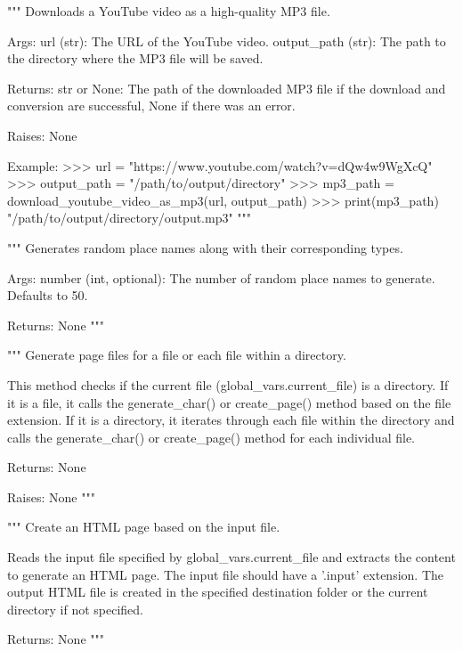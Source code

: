\begin{codebox}[Creator.download\_youtube\_video\_as\_mp3(self, url, output\_path="../music")]
"""
Downloads a YouTube video as a high-quality MP3 file.

Args:
    url (str): The URL of the YouTube video.
    output_path (str): The path to the directory where the MP3 file will be saved.

Returns:
    str or None: The path of the downloaded MP3 file if the download and conversion
                 are successful, None if there was an error.

Raises:
    None

Example:
    >>> url = "https://www.youtube.com/watch?v=dQw4w9WgXcQ"
    >>> output_path = "/path/to/output/directory"
    >>> mp3_path = download_youtube_video_as_mp3(url, output_path)
    >>> print(mp3_path)
    "/path/to/output/directory/output.mp3"
"""
\end{codebox}

\begin{codebox}[Creator.random\_place(self, number=100)]
"""
Generates random place names along with their corresponding types.

Args:
    number (int, optional): The number of random place names to generate. Defaults to 50.

Returns:
    None
"""
\end{codebox}

\begin{codebox}
"""
Generate page files for a file or each file within a directory.

This method checks if the current file (global_vars.current_file) is a directory.
If it is a file, it calls the generate_char() or create_page() method based on the file extension.
If it is a directory, it iterates through each file within the directory and calls the generate_char()
or create_page() method for each individual file.

Returns:
    None

Raises:
    None
"""
\end{codebox}

\begin{codebox}[Creator.create\_page(self, file=global\_vars.current\_file)]
"""
Create an HTML page based on the input file.

Reads the input file specified by global_vars.current_file and extracts the content to generate an HTML page.
The input file should have a '.input' extension.
The output HTML file is created in the specified destination folder or the current directory if not specified.

Returns:
    None
"""
\end{codebox}

